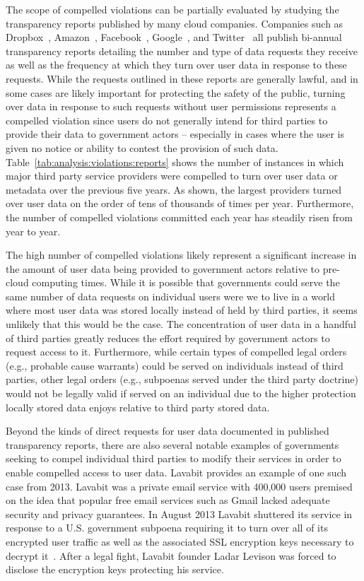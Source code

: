 The scope of compelled violations can be partially evaluated by
studying the transparency reports published by many cloud
companies. Companies such as Dropbox~\cite{dropbox-transparency},
Amazon~\cite{amazon-transparency},
Facebook~\cite{facebook-transparency},
Google~\cite{google-transparency}, and
Twitter~\cite{twitter-transparency} all publish bi-annual transparency
reports detailing the number and type of data requests they receive as
well as the frequency at which they turn over user data in response to
these requests. While the requests outlined in these reports are
generally lawful, and in some cases are likely important for
protecting the safety of the public, turning over data in response to
such requests without user permissions represents a compelled
violation since users do not generally intend for third parties to
provide their data to government actors -- especially in cases where
the user is given no notice or ability to contest the provision of
such data. Table~\ref{tab:analysis:violations:reports} shows the
number of instances in which major third party service providers were
compelled to turn over user data or metadata over the previous five
years. As shown, the largest providers turned over user data on the
order of tens of thousands of times per year. Furthermore, the number
of compelled violations committed each year has steadily risen from
year to year.

The high number of compelled violations likely represent a significant
increase in the amount of user data being provided to government
actors relative to pre-cloud computing times. While it is possible
that governments could serve the same number of data requests on
individual users were we to live in a world where most user data was
stored locally instead of held by third parties, it seems unlikely
that this would be the case. The concentration of user data in a
handful of third parties greatly reduces the effort required by
government actors to request access to it. Furthermore, while certain
types of compelled legal orders (e.g., probable cause warrants) could
be served on individuals instead of third parties, other legal orders
(e.g., subpoenas served under the third party doctrine) would not be
legally valid if served on an individual due to the higher protection
locally stored data enjoys relative to third party stored data.

Beyond the kinds of direct requests for user data documented in
published transparency reports, there are also several notable
examples of governments seeking to compel individual third parties to
modify their services in order to enable compelled access to user
data. Lavabit provides an example of one such case from 2013. Lavabit
was a private email service with 400,000 users premised on the idea
that popular free email services such as Gmail lacked adequate
security and privacy guarantees. In August 2013 Lavabit shuttered its
service in response to a U.S. government subpoena requiring it to turn
over all of its encrypted user traffic as well as the associated SSL
encryption keys necessary to decrypt it~\cite{lavabit,
  levsion-lavabit}. After a legal fight, Lavabit founder Ladar Levison
was forced to disclose the encryption keys protecting his service.

